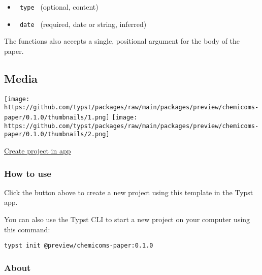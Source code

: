 \begin{itemize}
  \begin{itemize}
  \tightlist
  \item
    \texttt{\ type\ } (optional, content)
  \item
    \texttt{\ date\ } (required, date or string, inferred)
  \end{itemize}
\end{itemize}

The functions also accepts a single, positional argument for the body of
the paper.

\subsection{Media}\label{media}

\texttt{[image: https://github.com/typst/packages/raw/main/packages/preview/chemicoms-paper/0.1.0/thumbnails/1.png]}
\texttt{[image: https://github.com/typst/packages/raw/main/packages/preview/chemicoms-paper/0.1.0/thumbnails/2.png]}

\href{/app?template=chemicoms-paper&version=0.1.0}{Create project in
app}

\subsubsection{How to use}\label{how-to-use}

Click the button above to create a new project using this template in
the Typst app.

You can also use the Typst CLI to start a new project on your computer
using this command:

\begin{verbatim}
typst init @preview/chemicoms-paper:0.1.0
\end{verbatim}



\subsubsection{About}\label{about}

